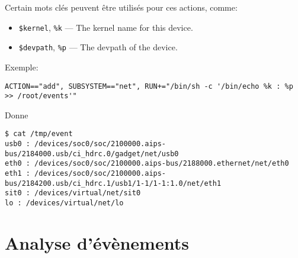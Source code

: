 \documentclass[compress,aspectratio=169]{beamer}
\begin{document}
\begin{frame}[fragile]
Certain mots clés peuvent être utilisés pour ces actions, comme:
\begin{itemize}
    \item \texttt{\$kernel}, \texttt{\%k} — The kernel name for this device.
    \item \texttt{\$devpath}, \texttt{\%p} — The devpath of the device.
\end{itemize}
Exemple:
\begin{lstlisting}[style=shell,basicstyle=\tiny\ttfamily\color{white}]
ACTION=="add", SUBSYSTEM=="net", RUN+="/bin/sh -c '/bin/echo %k : %p >> /root/events'"
\end{lstlisting}
Donne
\begin{lstlisting}[style=shell,basicstyle=\tiny\ttfamily\color{white}]
$ cat /tmp/event 
usb0 : /devices/soc0/soc/2100000.aips-bus/2184000.usb/ci_hdrc.0/gadget/net/usb0
eth0 : /devices/soc0/soc/2100000.aips-bus/2188000.ethernet/net/eth0
eth1 : /devices/soc0/soc/2100000.aips-bus/2184200.usb/ci_hdrc.1/usb1/1-1/1-1:1.0/net/eth1
sit0 : /devices/virtual/net/sit0
lo : /devices/virtual/net/lo
\end{lstlisting}
\end{frame}

\section{Analyse d'évènements}
\end{document}
